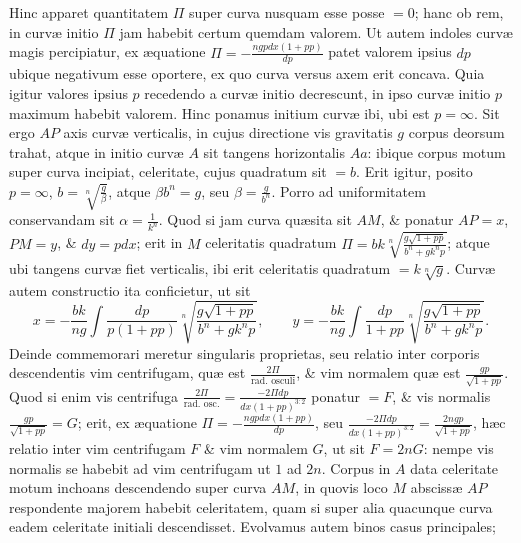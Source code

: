 Hinc apparet quantitatem $\Pi$ super curva nusquam esse posse $=0$; hanc ob rem, in curvæ initio $\Pi$ jam habebit certum quemdam valorem. Ut autem indoles curvæ magis percipiatur, ex æquatione $\Pi=-\frac{ngpdx(1+pp)}{dp}$ patet valorem ipsius $dp$ ubique negativum esse oportere, ex quo curva versus axem erit concava. Quia igitur valores ipsius $p$ recedendo a curvæ initio decrescunt, in ipso curvæ initio $p$ maximum habebit valorem. Hinc ponamus initium curvæ ibi, ubi est $p=\infty$. Sit ergo $AP$ axis curvæ verticalis, in cujus directione vis gravitatis $g$ corpus deorsum trahat, atque in initio curvæ $A$ sit tangens horizontalis $Aa$: ibique corpus motum super curva incipiat, celeritate, cujus quadratum sit $=b$. Erit igitur, posito $p=\infty$, $b=\sqrt[n]{\frac{g}{\beta}}$, atque $\beta b^n=g$, seu $\beta=\frac{g}{b^n}$. Porro ad uniformitatem conservandam sit $\alpha=\frac{1}{k^n}$. Quod si jam curva quæsita sit $AM$, \& ponatur $AP=x$, $PM=y$, \& $dy=pdx$; erit in $M$ celeritatis quadratum $\Pi=bk\sqrt[n]{\frac{g\sqrt{1+pp}}{b^n+gk^n p}}$; atque ubi tangens curvæ fiet verticalis, ibi erit celeritatis quadratum $=k\sqrt[n]{g}$. Curvæ autem constructio ita conficietur, ut sit
\[
x=-\frac{bk}{ng}\int\frac{dp}{p(1+pp)}\sqrt[n]{\frac{g\sqrt{1+pp}}{b^n+gk^n p}},\qquad
y=-\frac{bk}{ng}\int\frac{dp}{1+pp}\sqrt[n]{\frac{g\sqrt{1+pp}}{b^n+gk^n p}}.
\]
Deinde commemorari meretur singularis proprietas, seu relatio inter corporis descendentis vim centrifugam, quæ est $\frac{2\Pi}{\text{rad. osculi}}$, \& vim normalem quæ est $\frac{gp}{\sqrt{1+pp}}$. Quod si enim vis centrifuga $\frac{2\Pi}{\text{rad. osc.}}=\frac{-2\Pi dp}{dx(1+pp)^{3:2}}$ ponatur $=F$, \& vis normalis $\frac{gp}{\sqrt{1+pp}}=G$; erit, ex æquatione $\Pi=-\frac{ngpdx(1+pp)}{dp}$, seu $\frac{-2\Pi dp}{dx(1+pp)^{3:2}}=\frac{2ngp}{\sqrt{1+pp}}$, hæc relatio inter vim centrifugam $F$ \& vim normalem $G$, ut sit $F=2nG$: nempe vis normalis se habebit ad vim centrifugam ut $1$ ad $2n$. Corpus in $A$ data celeritate motum inchoans descendendo super curva $AM$, in quovis loco $M$ abscissæ $AP$ respondente majorem habebit celeritatem, quam si super alia quacunque curva eadem celeritate initiali descendisset. Evolvamus autem binos casus principales;

